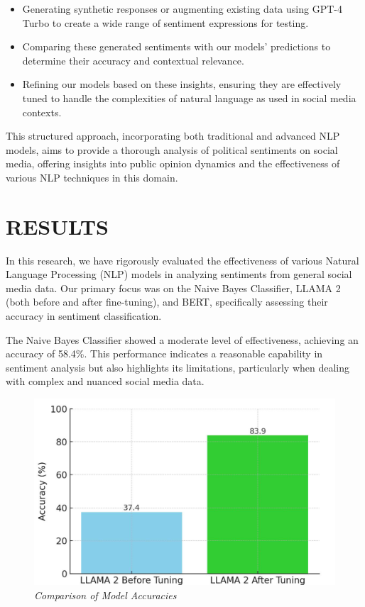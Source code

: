 \documentclass[10pt]{article}
\begin{document}
\begin{multicols}{2}
\begin{itemize}
\item Generating synthetic responses or augmenting existing data using GPT-4 Turbo to create a wide range of sentiment expressions for testing.
\item Comparing these generated sentiments with our models' predictions to determine their accuracy and contextual relevance.
\item Refining our models based on these insights, ensuring they are effectively tuned to handle the complexities of natural language as used in social media contexts.
\end{itemize}

This structured approach, incorporating both traditional and advanced NLP models, aims to provide a thorough analysis of political sentiments on social media, offering insights into public opinion dynamics and the effectiveness of various NLP techniques in this domain.


\section{RESULTS}

In this research, we have rigorously evaluated the effectiveness of various Natural Language Processing (NLP) models in analyzing sentiments from general social media data. Our primary focus was on the Naive Bayes Classifier, LLAMA 2 (both before and after fine-tuning), and BERT, specifically assessing their accuracy in sentiment classification.

The Naive Bayes Classifier showed a moderate level of effectiveness, achieving an accuracy of 58.4\%. This performance indicates a reasonable capability in sentiment analysis but also highlights its limitations, particularly when dealing with complex and nuanced social media data.

\begin{figure}[H]
    \centering
    \includegraphics[width=1\linewidth]{fig1.png}
    \caption{\justifying \textit{Comparison of Model Accuracies}}
    \label{fig:FIG 1}
\end{figure}


\end{multicols}
\end{document}
